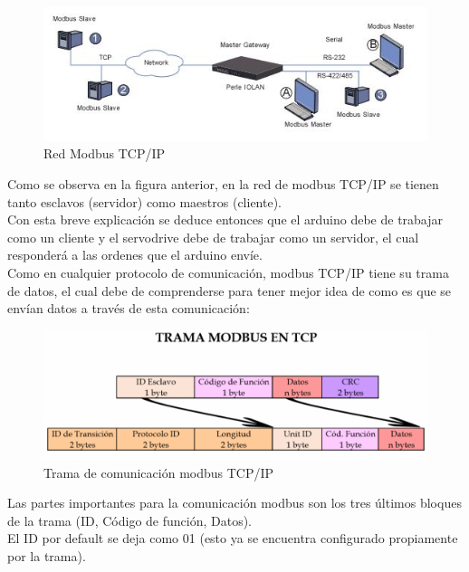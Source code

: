 \documentclass[12pt,titlepage]{article}
\begin{document}
 \begin{figure}[htbp]
\hspace*{1.9cm} 
\includegraphics[scale=1.0]{red_modbus2}
\caption{Red Modbus TCP/IP }
\end{figure}

Como se observa en la figura anterior, en la red de modbus TCP/IP se tienen tanto esclavos (servidor) como maestros (cliente). \\

Con esta breve explicación se deduce entonces que el arduino debe de trabajar como un cliente y el servodrive debe de trabajar como un servidor, el cual responderá a las ordenes que el arduino envíe. \\ 

Como en cualquier protocolo de comunicación, modbus TCP/IP tiene su trama de datos, el cual debe de comprenderse para tener mejor idea de como es que se envían datos a través de esta comunicación: \\ 

 \begin{figure}[htbp]
\hspace*{1.9cm} 
\includegraphics[scale=0.50]{trama_modbus}
\caption{Trama de comunicación modbus TCP/IP }
\end{figure}

\newpage

Las partes importantes para la comunicación modbus son los tres últimos bloques de la trama (ID, Código de función, Datos). \\ 

El ID por default se deja como 01 (esto ya se encuentra configurado propiamente por la trama). \\
\end{document}
